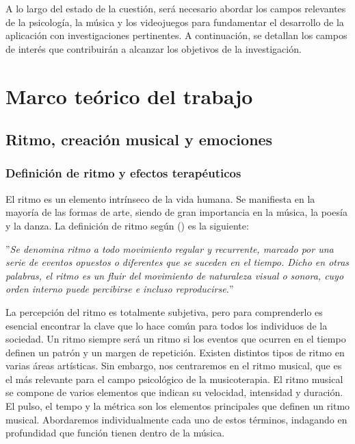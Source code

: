 A lo largo del estado de la cuestión, será necesario abordar los campos relevantes de la psicología, la música y los videojuegos para fundamentar el desarrollo de la aplicación con investigaciones pertinentes. A continuación, se detallan los campos de interés que contribuirán a alcanzar los objetivos de la investigación.

\section{Marco teórico del trabajo}

\subsection{Ritmo, creación musical y emociones}

\subsubsection{Definición de ritmo y efectos terapéuticos}

El ritmo es un elemento intrínseco de la vida humana. Se manifiesta en la mayoría de las formas de arte, siendo de gran importancia en la música, la poesía y la danza. La definición de ritmo según \citeauthor{CONCEPTO:2021} (\citeyear{CONCEPTO:2021}) es la siguiente:

\begin{adjustwidth}{100pt}{0pt}
	''\textit{Se denomina ritmo a todo movimiento regular y recurrente, marcado por una serie de eventos opuestos o diferentes que se suceden en el tiempo. Dicho en otras palabras, el ritmo es un fluir del movimiento de naturaleza visual o sonora, cuyo orden interno puede percibirse e incluso reproducirse.}''
\end{adjustwidth}

La percepción del ritmo es totalmente subjetiva, pero para comprenderlo es esencial encontrar la clave que lo hace común para todos los individuos de la sociedad. Un ritmo siempre será un ritmo si los eventos que ocurren en el tiempo definen un patrón y un margen de repetición. Existen distintos tipos de ritmo en varias áreas artísticas. Sin embargo, nos centraremos en el ritmo musical, que es el más relevante para el campo psicológico de la musicoterapia. El ritmo musical se compone de varios elementos que indican su velocidad, intensidad y duración. El pulso, el tempo y la métrica son los elementos principales que definen un ritmo musical. Abordaremos individualmente cada uno de estos términos, indagando en profundidad que función tienen dentro de la música.

